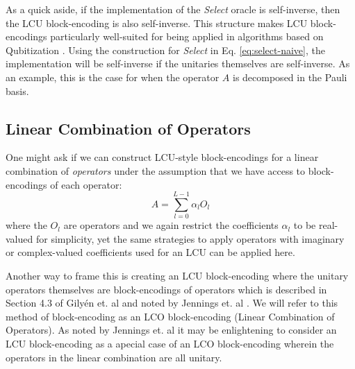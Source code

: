 As a quick aside, if the implementation of the \textit{Select} oracle is self-inverse, then the LCU block-encoding is also self-inverse.
This structure makes LCU block-encodings particularly well-suited for being applied in algorithms based on Qubitization \cite{low2019hamiltonian}.
Using the construction for \textit{Select} in Eq. \ref{eq:select-naive}, the implementation will be self-inverse if the unitaries themselves are self-inverse.
As an example, this is the case for when the operator $A$ is decomposed in the Pauli basis.

\subsection{Linear Combination of Operators}
\label{subsec:lco}

One might ask if we can construct LCU-style block-encodings for a linear combination of \textit{operators} under the assumption that we have access to block-encodings of each operator:
\begin{equation}
    \label{eq:lco}
    A = \sum_{l=0}^{L-1} \alpha_l O_l
\end{equation}
where the $O_l$ are operators and we again restrict the coefficients $\alpha_l$ to be real-valued for simplicity, yet the same strategies to apply operators with imaginary or complex-valued coefficients used for an LCU can be applied here.

Another way to frame this is creating an LCU block-encoding where the unitary operators themselves are block-encodings of operators which is described in Section 4.3 of Gilyén et. al \cite{gilyen2019quantum} and noted by Jennings et. al \cite{jennings2023efficient}. 
We will refer to this method of block-encoding as an LCO block-encoding (Linear Combination of Operators).
As noted by Jennings et. al \cite{jennings2023efficient} it may be enlightening to consider an LCU block-encoding as a apecial case of an LCO block-encoding wherein the operators in the linear combination are all unitary.

